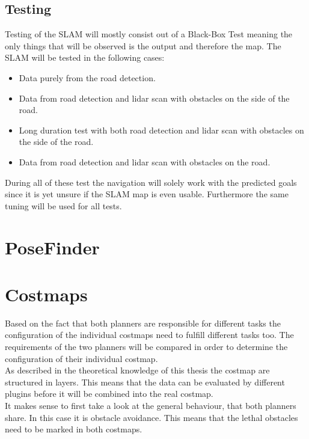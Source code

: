 \subsection{Testing}
Testing of the SLAM will mostly consist out of a Black-Box Test meaning the only things that will be observed is the output and therefore the map.
The SLAM will be tested in the following cases:
\begin{itemize}
	\item Data purely from the road detection.
	\item Data from road detection and lidar scan with obstacles on the side of the road.
	\item Long duration test with both road detection and lidar scan with obstacles on the side of the road.
	\item Data from road detection and lidar scan with obstacles on the road.
\end{itemize}

During all of these test the navigation will solely work with the predicted goals since it is yet unsure if the SLAM map is even usable. Furthermore the same tuning will be used for all tests.\\



\section{PoseFinder}



\section{Costmaps}
Based on the fact that both planners are responsible for different tasks the configuration of the individual costmaps need to fulfill different tasks too. The requirements of the two planners will be compared in order to determine the configuration of their individual costmap.\\

As described in the theoretical knowledge of this thesis the costmap are structured in layers. This means that the data can be evaluated by different plugins before it will be combined into the real costmap.\\

It makes sense to first take a look at the general behaviour, that both planners share. In this case it is obstacle avoidance. This means that the lethal obstacles need to be marked in both costmaps.\\

